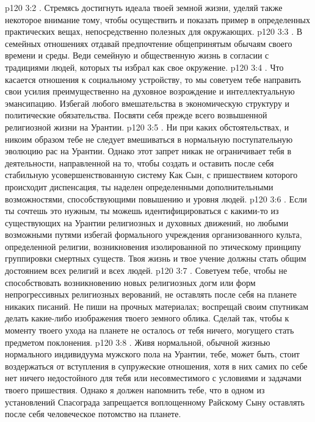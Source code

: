 \vs p120 3:2 . Стремясь достигнуть идеала твоей земной жизни, уделяй также некоторое внимание тому, чтобы осуществить и показать пример в определенных практических вещах, непосредственно полезных для окружающих.
\vs p120 3:3 \pc . В семейных отношениях отдавай предпочтение общепринятым обычаям своего времени и среды. Веди семейную и общественную жизнь в согласии с традициями людей, которых ты избрал как свое окружение.
\vs p120 3:4 \pc . Что касается отношения к социальному устройству, то мы советуем тебе направить свои усилия преимущественно на духовное возрождение и интеллектуальную эмансипацию. Избегай любого вмешательства в экономическую структуру и политические обязательства. Посвяти себя прежде всего возвышенной религиозной жизни на Урантии.
\vs p120 3:5 \pc . Ни при каких обстоятельствах, и никоим образом тебе не следует вмешиваться в нормальную поступательную эволюцию рас на Урантии. Однако этот запрет никак не ограничивает тебя в деятельности, направленной на то, чтобы создать и оставить после себя стабильную усовершенствованную систему  Как Сын, с пришествием которого происходит диспенсация, ты наделен определенными дополнительными возможностями, способствующими повышению  и  уровня людей.
\vs p120 3:6 \pc . Если ты сочтешь это нужным, ты можешь идентифицироваться с какими\hyp{}то из существующих на Урантии религиозных и духовных движений, но любыми возможными путями избегай формального учреждения организованного культа, определенной религии, возникновения изолированной по этическому принципу группировки смертных существ. Твоя жизнь и твое учение должны стать общим достоянием всех религий и всех людей.
\vs p120 3:7 \pc . Советуем тебе, чтобы не способствовать возникновению новых религиозных догм или форм непрогрессивных религиозных верований, не оставлять после себя на планете никаких писаний. Не пиши на прочных материалах; воспрещай своим спутникам делать какие\hyp{}либо изображения твоего земного облика. Сделай так, чтобы к моменту твоего ухода на планете не осталось от тебя ничего, могущего стать предметом поклонения.
\vs p120 3:8 \pc . Живя нормальной, обычной жизнью нормального индивидуума мужского пола на Урантии, тебе, может быть, стоит воздержаться от вступления в супружеские отношения, хотя в них самих по себе нет ничего недостойного для тебя или несовместимого с условиями и задачами твоего пришествия. Однако я должен напомнить тебе, что в одном из установлений Спасограда запрещается воплощенному Райскому Сыну оставлять после себя человеческое потомство на планете.
